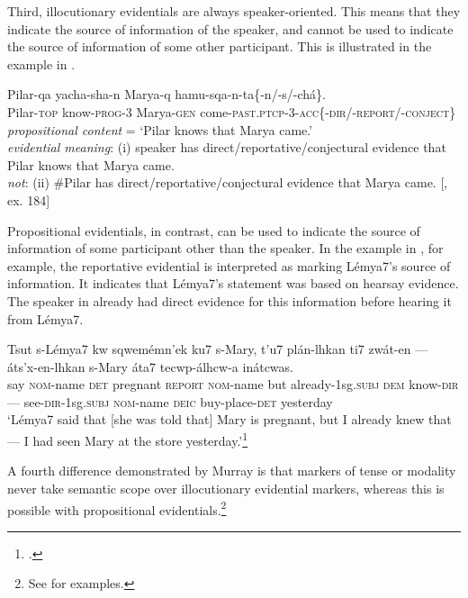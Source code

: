 Third, illocutionary evidentials are always speaker-oriented. This means that they indicate the source of information of the speaker, and cannot be used to indicate the source of information of some other participant. This is illustrated in the  example in .


\ea \label{ex:17.13}
\gll Pilar-qa  yacha-sha-n  Marya-q  hamu-sqa-n-ta\{-n/-s/-chá\}.\\
Pilar-\textsc{top}  know-\textsc{prog}-3  Marya-\textsc{gen}  come-\textsc{past.ptcp}-3-\textsc{acc\{-dir}/-\textsc{report}/-\textsc{conject\}}\\
\glt \textit{propositional content} = ‘Pilar knows that Marya came.’\\
\textit{evidential meaning}: (i) speaker has direct/reportative/conjectural evidence that Pilar knows that Marya came.\\
\textit{not}: (ii) \#Pilar has direct/reportative/conjectural evidence that Marya came. 
     {}[\citealt{Faller2002}, ex. 184]
\z


Propositional evidentials, in contrast, can be used to indicate the source of information of some participant other than the speaker. In the  example in , for example, the reportative evidential is interpreted as marking Lémya7’s source of information. It indicates that Lémya7’s statement was based on hearsay evidence. The speaker in  already had direct evidence for this information before hearing it from Lémya7.

\newpage

\ea  \label{ex:17.14}
\gll Tsut  s-Lémya7  kw  sqwemémn’ek  ku7  s-Mary,  t’u7  plán-lhkan ti7  zwát-en  ---  áts’x-en-lhkan  s-Mary  áta7  tecwp-álhcw-a  inátcwas.\\
say  \textsc{nom}-name  \textsc{det}  pregnant  \textsc{report}  \textsc{nom}-name  but  already-1sg.\textsc{subj} \textsc{dem}  know-\textsc{dir}  ---  see-\textsc{dir}-1sg.\textsc{subj}  \textsc{nom}-name  \textsc{deic}  buy-place-\textsc{det}  yesterday\\
\glt ‘Lémya7 said that [she was told that] Mary is pregnant, but I already knew that — I had seen Mary at the store yesterday.’\footnote{\citet{MatthewsonEtAl2007}.}
\z

A fourth difference demonstrated by Murray is that markers of tense or modality never take semantic scope over illocutionary evidential markers, whereas this is possible with propositional evidentials.\footnote{See \citet[§3.4.2]{Murray2010} for examples.}



